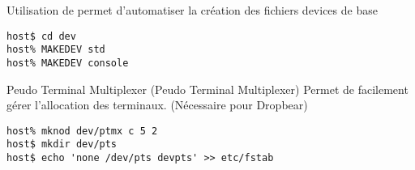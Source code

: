 
\begin{frame}[fragile=singleslide]{Utilisation de }
   permet d'automatiser  la création des fichiers devices
  de base
  \begin{lstlisting}
host$ cd dev
host% MAKEDEV std
host% MAKEDEV console
  \end{lstlisting}
\end{frame}

\begin{frame}[fragile=singleslide]{Peudo Terminal Multiplexer}
   (Peudo  Terminal Multiplexer) Permet  de facilement gérer
  l'allocation des terminaux. (Nécessaire pour Dropbear)
  \begin{lstlisting}
host% mknod dev/ptmx c 5 2
host$ mkdir dev/pts
host$ echo 'none /dev/pts devpts' >> etc/fstab
  \end{lstlisting}
\end{frame}

